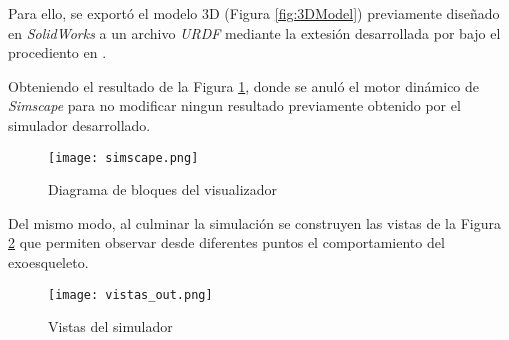     Para ello, se exportó el modelo 3D (Figura \ref{fig:3DModel}) previamente diseñado en \emph{SolidWorks} a un archivo
    \emph{URDF} \cite{urdf} mediante la extesión desarrollada por \cite{sw2urdf} bajo el procediento en \cite{import_urdf}. 

    Obteniendo el resultado de la Figura \ref{fig:visualizador}, donde se anuló el motor dinámico de 
    \emph{Simscape} para no modificar ningun resultado previamente obtenido por el simulador desarrollado.
    \begin{figure}[H]
        \texttt{[image: simscape.png]}
        \centering
        \caption{Diagrama de bloques del visualizador}
        \label{fig:visualizador}
    \end{figure}
    Del mismo modo, al culminar la simulación se construyen las vistas de la Figura \ref{fig:vistas} que permiten observar desde diferentes
    puntos el comportamiento del exoesqueleto. 
    \begin{figure}[h]
        \texttt{[image: vistas\_out.png]}
        \centering
        \caption{ Vistas del simulador }
        \label{fig:vistas}
    \end{figure}
    
    